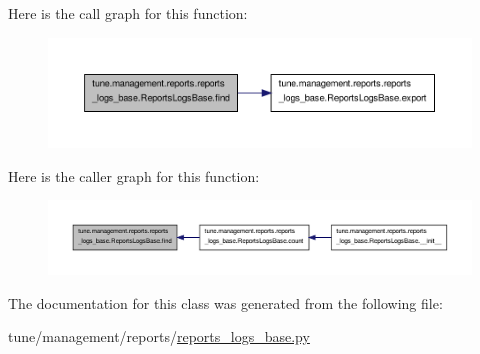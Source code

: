 Here is the call graph for this function\-:
\nopagebreak
\begin{figure}[H]
\begin{center}
\leavevmode
\includegraphics[width=350pt]{classtune_1_1management_1_1reports_1_1reports__logs__base_1_1ReportsLogsBase_aa5e600c4e26a37c9f71230b38b53a7fb_cgraph}
\end{center}
\end{figure}




Here is the caller graph for this function\-:
\nopagebreak
\begin{figure}[H]
\begin{center}
\leavevmode
\includegraphics[width=350pt]{classtune_1_1management_1_1reports_1_1reports__logs__base_1_1ReportsLogsBase_aa5e600c4e26a37c9f71230b38b53a7fb_icgraph}
\end{center}
\end{figure}




The documentation for this class was generated from the following file\-:\begin{DoxyCompactItemize}
\item 
tune/management/reports/\hyperlink{reports__logs__base_8py}{reports\-\_\-logs\-\_\-base.\-py}\end{DoxyCompactItemize}
